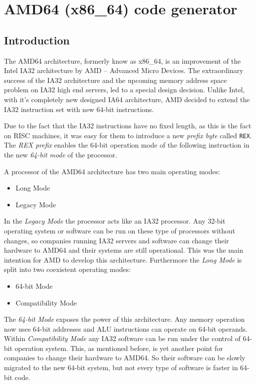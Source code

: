 \section{AMD64 (x86\_64) code generator}

\subsection{Introduction}

The AMD64 architecture, formerly know as x86\_64, is an improvement of
the Intel IA32 architecture by AMD -- Advanced Micro Devices. The
extraordinary success of the IA32 architecture and the upcoming memory
address space problem on IA32 high end servers, led to a special
design decision. Unlike Intel, with it's completely new designed IA64
architecture, AMD decided to extend the IA32 instruction set with
new 64-bit instructions.

Due to the fact that the IA32 instructions have no fixed length, as
this is the fact on RISC machines, it was easy for them to introduce a
new \textit{prefix byte} called \texttt{REX}. The \textit{REX prefix}
enables the 64-bit operation mode of the following instruction in the
new \textit{64-bit mode} of the processor.

A processor of the AMD64 architecture has two main operating modes:

\begin{itemize}
\item Long Mode
\item Legacy Mode
\end{itemize}

In the \textit{Legacy Mode} the processor acts like an IA32
processor. Any 32-bit operating system or software can be run on these
type of processors without changes, so companies running IA32 servers
and software can change their hardware to AMD64 and their systems are
still operational. This was the main intention for AMD to develop this
architecture. Furthermore the \textit{Long Mode} is split into two
coexistent operating modes:

\begin{itemize}
\item 64-bit Mode
\item Compatibility Mode
\end{itemize}

The \textit{64-bit Mode} exposes the power of this architecture. Any
memory operation now uses 64-bit addresses and ALU instructions can
operate on 64-bit operands. Within \textit{Compatibility Mode} any
IA32 software can be run under the control of 64-bit operation
system. This, as mentioned before, is yet another point for companies
to change their hardware to AMD64. So their software can be slowly
migrated to the new 64-bit system, but not every type of software is
faster in 64-bit code.

